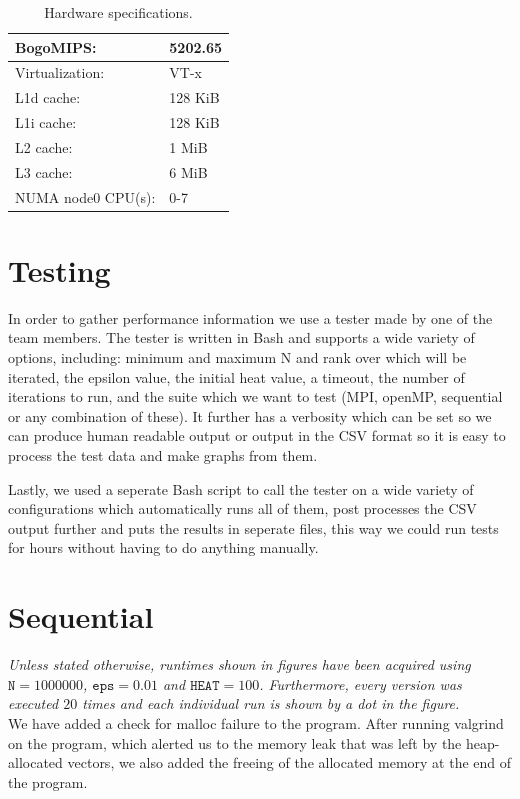 \documentclass[a4paper]{article}
\begin{document}
\begin{table}[h]
\begin{tabular}{|l|l|}
        BogoMIPS:            &    5202.65\\\hline
        Virtualization:      &    VT-x\\\hline
        L1d cache:           &    128 KiB\\\hline
        L1i cache:           &    128 KiB\\\hline
        L2 cache:            &    1 MiB\\\hline
        L3 cache:            &    6 MiB\\\hline
        NUMA node0 CPU(s):   &    0-7\\
        \hline
    \end{tabular}
    \caption{Hardware specifications.}
    \label{tab: hardware}
\end{table}

\section{Testing}
In order to gather performance information we use a tester made by one of the team members. The tester is written in Bash and supports a wide variety of options, including: minimum and maximum N and rank over which will be iterated, the epsilon value, the initial heat value, a timeout, the number of iterations to run, and the suite which we want to test (MPI, openMP, sequential or any combination of these). It further has a verbosity which can be set so we can produce human readable output or output in the CSV format so it is easy to process the test data and make graphs from them.

Lastly, we used a seperate Bash script to call the tester on a wide variety of configurations which automatically runs all of them, post processes the CSV output further and puts the results in seperate files, this way we could run tests for hours without having to do anything manually.


\section{Sequential}
\textit{Unless stated otherwise, runtimes shown in figures have been acquired using $\texttt{N} = 1000000$, $\texttt{eps} = 0.01$ and $\texttt{HEAT} = 100$. Furthermore, every version was executed $20$ times and each individual run is shown by a dot in the figure.}\\

\noindent We have added a check for malloc failure to the program. After running valgrind on the program, which alerted us to the memory leak that was left by the heap-allocated vectors, we also added the freeing of the allocated memory at the end of the program.
\end{document}

